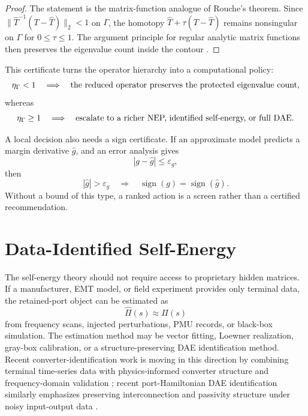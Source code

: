 \begin{proof}
The statement is the matrix-function analogue of Rouche's theorem. Since
\(\|\widehat T^{-1}(T-\widehat T)\|_2<1\) on \(\Gamma\), the homotopy
\(\widehat T+\tau(T-\widehat T)\) remains nonsingular on \(\Gamma\) for
\(0\le\tau\le1\). The argument principle for regular analytic matrix
functions then preserves the eigenvalue count inside the contour
\cite{kato1995perturbation,guettel2017nep}.
\end{proof}

This certificate turns the operator hierarchy into a computational policy:
\begin{equation}
  \eta_\Gamma<1
  \quad\Longrightarrow\quad
  \hbox{the reduced operator preserves the protected eigenvalue count,}
  \label{eq:self_eta_policy_accept}
\end{equation}
whereas
\begin{equation}
  \eta_\Gamma\ge1
  \quad\Longrightarrow\quad
  \hbox{escalate to a richer NEP, identified self-energy, or full DAE.}
  \label{eq:self_eta_policy_escalate}
\end{equation}

A local decision also needs a sign certificate. If an approximate model
predicts a margin derivative \(\widehat g\), and an error analysis gives
\begin{equation}
  |g-\widehat g|\le\varepsilon_g ,
  \label{eq:self_sign_error_bound}
\end{equation}
then
\begin{equation}
  |\widehat g|>\varepsilon_g
  \quad\Longrightarrow\quad
  \operatorname{sign}(g)=\operatorname{sign}(\widehat g).
  \label{eq:self_sign_certificate}
\end{equation}
Without a bound of this type, a ranked action is a screen rather than a
certified recommendation.

\section{Data-Identified Self-Energy}

The self-energy theory should not require access to proprietary hidden
matrices. If a manufacturer, EMT model, or field experiment provides only
terminal data, the retained-port object can be estimated as
\begin{equation}
  \widehat\Pi(s)
  \approx
  \Pi(s)
  \label{eq:self_identified_pi}
\end{equation}
from frequency scans, injected perturbations, PMU records, or black-box
simulation. The estimation method may be vector fitting, Loewner realization,
gray-box calibration, or a structure-preserving DAE identification method.
Recent converter-identification work is moving in this direction by combining
terminal time-series data with physics-informed converter structure and
frequency-domain validation \cite{darii2026graybox}; recent
port-Hamiltonian DAE identification similarly emphasizes preserving
interconnection and passivity structure under noisy input-output data
\cite{hagelaars2026identification}.

